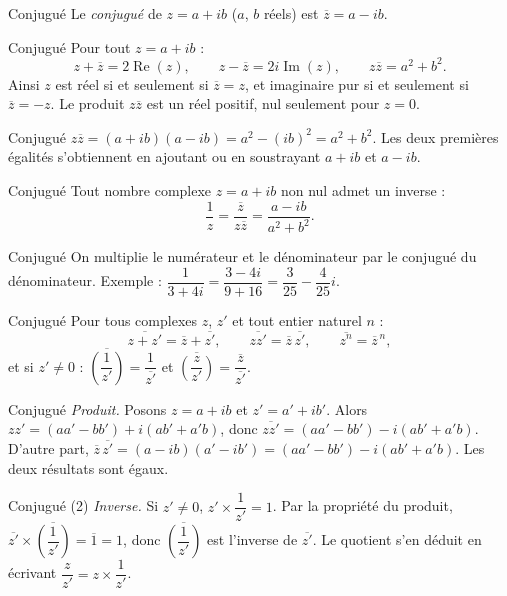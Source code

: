 \documentclass[aspectratio=169,10pt]{beamer}
\begin{document}
\begin{frame}{Conjugué}
Le \emph{conjugué} de \(z=a+ib\) (\(a\), \(b\) réels) est \(\overline{z}=a-ib\).
\end{frame}
\begin{frame}{Conjugué}
Pour tout \(z=a+ib\) :
\[z+\overline z=2\operatorname{Re}(z),\qquad z-\overline z=2i\operatorname{Im}(z),\qquad z\overline z=a^2+b^2.\]
Ainsi \(z\) est réel si et seulement si \(\overline z=z\), et imaginaire pur si et seulement si \(\overline z=-z\). Le produit \(z\overline z\) est un réel positif, nul seulement pour \(z=0\).
\end{frame}
\begin{frame}{Conjugué}
\(z\overline z=(a+ib)(a-ib)=a^2-(ib)^2=a^2+b^2\). Les deux premières égalités s'obtiennent en ajoutant ou en soustrayant \(a+ib\) et \(a-ib\).
\end{frame}
\begin{frame}{Conjugué}
Tout nombre complexe \(z=a+ib\) non nul admet un inverse :
\[\dfrac1z=\dfrac{\overline z}{z\overline z}=\dfrac{a-ib}{a^2+b^2}.\]
\end{frame}
\begin{frame}{Conjugué}
On multiplie le numérateur et le dénominateur par le conjugué du dénominateur. Exemple : \(\dfrac{1}{3+4i}=\dfrac{3-4i}{9+16}=\dfrac{3}{25}-\dfrac{4}{25}i\).
\end{frame}
\begin{frame}{Conjugué}
Pour tous complexes \(z\), \(z'\) et tout entier naturel \(n\) :
\[\overline{z+z'}=\overline z+\overline{z'},\qquad\overline{zz'}=\overline z\,\overline{z'},\qquad\overline{z^n}=\overline z^{\,n},\]
et si \(z'\neq0\) : \(\overline{\left(\dfrac1{z'}\right)}=\dfrac1{\overline{z'}}\) et \(\overline{\left(\dfrac z{z'}\right)}=\dfrac{\overline z}{\overline{z'}}\).
\end{frame}
\begin{frame}{Conjugué}
\emph{Produit.} Posons \(z=a+ib\) et \(z'=a'+ib'\). Alors \(zz'=(aa'-bb')+i(ab'+a'b)\), donc \(\overline{zz'}=(aa'-bb')-i(ab'+a'b)\). D'autre part, \(\overline z\,\overline{z'}=(a-ib)(a'-ib')=(aa'-bb')-i(ab'+a'b)\). Les deux résultats sont égaux.
\end{frame}
\begin{frame}{Conjugué (2)}
\emph{Inverse.} Si \(z'\neq0\), \(z'\times\dfrac1{z'}=1\). Par la propriété du produit, \(\overline{z'}\times\overline{\left(\dfrac1{z'}\right)}=\overline1=1\), donc \(\overline{\left(\dfrac1{z'}\right)}\) est l'inverse de \(\overline{z'}\). Le quotient s'en déduit en écrivant \(\dfrac z{z'}=z\times\dfrac1{z'}\).
\end{frame}
\end{document}
